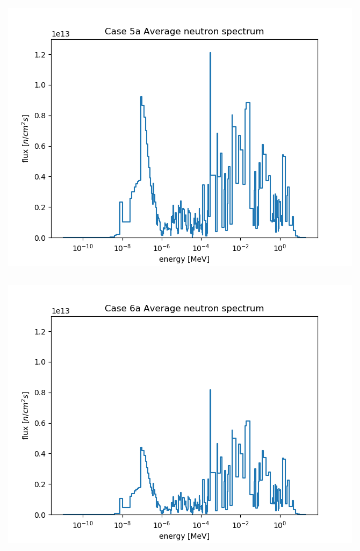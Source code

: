 \documentclass[letterpaper,11pt]{report}
\begin{document}
\begin{figure}[H]
\begin{subfigure}{.33\textwidth}
                \includegraphics[width=\linewidth]{../../phase1a/case5a/analysis_output/p1a_5a_f.png}
                \caption{}
              \end{subfigure}
              \begin{subfigure}{.33\textwidth}
                \centering
                \includegraphics[width=\linewidth]{../../phase1a/case6a/analysis_output/p1a_6a_f.png}
                \caption{}
              \end{subfigure}
              \begin{subfigure}{.32\textwidth}
                \centering

\end{subfigure}
\end{figure}
\end{document}
